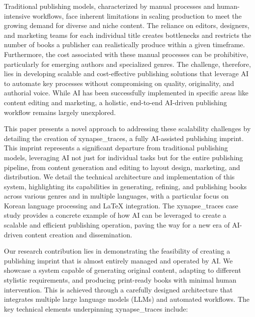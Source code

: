 \documentclass{article}
\begin{document}
{{{Traditional publishing models, characterized by manual processes and human-intensive workflows, face inherent limitations in scaling production to meet the growing demand for diverse and niche content. The reliance on editors, designers, and marketing teams for each individual title creates bottlenecks and restricts the number of books a publisher can realistically produce within a given timeframe. Furthermore, the cost associated with these manual processes can be prohibitive, particularly for emerging authors and specialized genres. The challenge, therefore, lies in developing scalable and cost-effective publishing solutions that leverage AI to automate key processes without compromising on quality, originality, and authorial voice. While AI has been successfully implemented in specific areas like content editing and marketing, a holistic, end-to-end AI-driven publishing workflow remains largely unexplored.

This paper presents a novel approach to addressing these scalability challenges by detailing the creation of xynapse_traces, a fully AI-assisted publishing imprint. This imprint represents a significant departure from traditional publishing models, leveraging AI not just for individual tasks but for the entire publishing pipeline, from content generation and editing to layout design, marketing, and distribution. We detail the technical architecture and implementation of this system, highlighting its capabilities in generating, refining, and publishing books across various genres and in multiple languages, with a particular focus on Korean language processing and LaTeX integration. The xynapse_traces case study provides a concrete example of how AI can be leveraged to create a scalable and efficient publishing operation, paving the way for a new era of AI-driven content creation and dissemination.

Our research contribution lies in demonstrating the feasibility of creating a publishing imprint that is almost entirely managed and operated by AI. We showcase a system capable of generating original content, adapting to different stylistic requirements, and producing print-ready books with minimal human intervention. This is achieved through a carefully designed architecture that integrates multiple large language models (LLMs) and automated workflows. The key technical elements underpinning xynapse_traces include:

}}}
\end{document}
